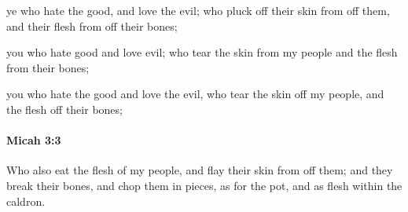 			\begin{versebox}
					\item[BHS] 
					\item[LXX] 
					\item[ASV] ye who hate the good, and love the evil; who pluck off their skin from off them, and their flesh from off their bones;
					\item[NIV] you who hate good and love evil; who tear the skin from my people and the flesh from their bones;
					\item[NRSV] you who hate the good and love the evil, who tear the skin off my people, and the flesh off their bones;
			\end{versebox}

		\paragraph{Micah 3:3} %
			\label{MICAH-3-3}

			Who also eat the flesh of my people, and flay their skin from off them; and they break their bones, and chop them in pieces, as for the pot, and as flesh within the caldron.

